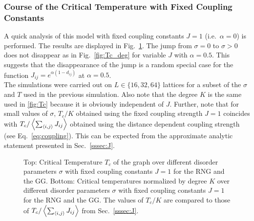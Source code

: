     \subsubsection{Course of the Critical Temperature with Fixed Coupling Constants}
    \label{appendix:fixedCoupling}
        A quick analysis of this model with fixed coupling constants \(J = 1\)
        (i.e.\ \(\alpha=0\)) is performed. The results are displayed in Fig.\ \ref{fig:Tc_deg_A0}.
        The jump from \(\sigma=0\) to \(\sigma>0\) does not disappear as in Fig.\ \ref{fig:Tc_deg}
        for variable \(J\) with \(\alpha=0.5\). This suggests that the
        disappearance of the jump is a random special case for the function
        \(J_{ij}=e^{\alpha(1-d_{ij})}\) at \(\alpha=0.5\).\\
        The simulations were carried out on \(L \in \{16,32,64\}\) lattices
        for a subset of the \(\sigma\) and \(T\) used in the previous simulation.
        Also note that the degree \(K\) is
        the same used in \ref{fig:Tc}
        because it is obviously independent of \(J\).
        Further, note that for small values of \(\sigma\), \(T_c / K\)
        obtained using the fixed coupling strength \(J=1\) coincides with
        \(T_c / \left< \sum_{\left< i,j \right>}J_{ij} \right>\) obtained using the distance
        dependent coupling strength (see Eq.\ \ref{eq:coupling}).
        This can be expected from the approximate analytic statement presented
        in Sec.\ \ref{sssec:J}.
        \begin{figure}[htb]
            \centering


            \caption[Critical Temperature and Critical Temperature Normalized by Degree of the Graph for Fixed Coupling Constants $J=1$]
            {
                Top: Critical Temperature \(T_c\) of the graph over different
                disorder parameters \(\sigma\) with fixed coupling constants \(J=1\) for
                 the RNG and
                 the GG.
                Bottom: Critical temperatures normalized by degree \(K\) over
                different disorder parameters \(\sigma\) with fixed coupling constants \(J=1\) for
                 the RNG and
                 the GG. The values of \(T_c / K\)
                are compared to those of \(T_c /  \left< \sum_{\left< i,j \right>}J_{ij} \right>\)
                from Sec.\ \ref{sssec:J}.
            }
            \label{fig:Tc_deg_A0}
        \end{figure}\\
